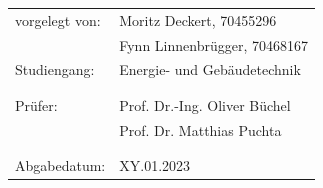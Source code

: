 \vspace*{1cm}
\large
\begin{center}
	\begin{tabular}{ll}
		vorgelegt von: & Moritz Deckert, 70455296 \vspace{2mm}\\	
		& Fynn Linnenbrügger, 70468167 \vspace{2mm}\\	
		Studiengang: & Energie- und Gebäudetechnik \vspace{2mm}\\
		& \\
		& \\	
		Prüfer:&Prof. Dr.-Ing. Oliver Büchel \vspace{2mm}\\	
		& Prof. Dr. Matthias Puchta \vspace{2mm}\\	
		& \\
		& \\
		Abgabedatum:& XY.01.2023
	\end{tabular}
\end{center}
